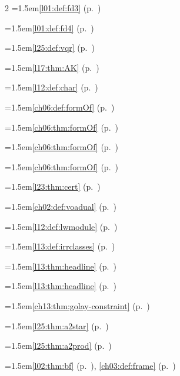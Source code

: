 \begin{multicols}{2}
\hangindent=1.5em\quad \ref{l01:def:fd3} (p.~\pageref{l01:def:fd3})\par
\hangindent=1.5em\quad \ref{l01:def:fd4} (p.~\pageref{l01:def:fd4})\par
\hangindent=1.5em\quad \ref{l25:def:vqr} (p.~\pageref{l25:def:vqr})\par
\hangindent=1.5em\quad \ref{l17:thm:AK} (p.~\pageref{l17:thm:AK})\par
\hangindent=1.5em\quad \ref{l12:def:char} (p.~\pageref{l12:def:char})\par
\hangindent=1.5em\quad \ref{ch06:def:formOf} (p.~\pageref{ch06:def:formOf})\par
\hangindent=1.5em\quad \ref{ch06:thm:formOf} (p.~\pageref{ch06:thm:formOf})\par
\hangindent=1.5em\quad \ref{ch06:thm:formOf} (p.~\pageref{ch06:thm:formOf})\par
\hangindent=1.5em\quad \ref{ch06:thm:formOf} (p.~\pageref{ch06:thm:formOf})\par
\hangindent=1.5em\quad \ref{l23:thm:cert} (p.~\pageref{l23:thm:cert})\par
\hangindent=1.5em\quad \ref{ch02:def:voadual} (p.~\pageref{ch02:def:voadual})\par
\hangindent=1.5em\quad \ref{l12:def:lwmodule} (p.~\pageref{l12:def:lwmodule})\par
\hangindent=1.5em\quad \ref{l13:def:irrclasses} (p.~\pageref{l13:def:irrclasses})\par
\hangindent=1.5em\quad \ref{l13:thm:headline} (p.~\pageref{l13:thm:headline})\par
\hangindent=1.5em\quad \ref{l13:thm:headline} (p.~\pageref{l13:thm:headline})\par
\hangindent=1.5em\quad \ref{ch13:thm:golay-constraint} (p.~\pageref{ch13:thm:golay-constraint})\par
\hangindent=1.5em\quad \ref{l25:thm:a2star} (p.~\pageref{l25:thm:a2star})\par
\hangindent=1.5em\quad \ref{l25:thm:a2prod} (p.~\pageref{l25:thm:a2prod})\par
\hangindent=1.5em\quad \ref{l02:thm:bf} (p.~\pageref{l02:thm:bf}), \ref{ch03:def:frame} (p.~\pageref{ch03:def:frame})\par

\end{multicols}
